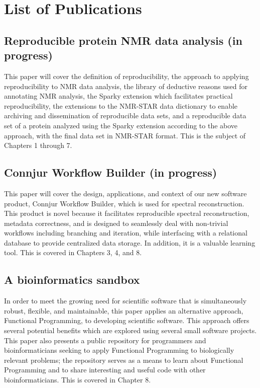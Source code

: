 \chapter{List of Publications}

\section{Reproducible protein NMR data analysis (in progress)}
This paper will cover the definition of reproducibility, the approach to
applying reproducibility to NMR data analysis, the library of deductive
reasons used for annotating NMR analysis, the Sparky extension which 
facilitates practical reproducibility, the extensions to the NMR-STAR
data dictionary to enable archiving and dissemination of reproducible
data sets, and a reproducible data set of a protein analyzed using the Sparky
extension according to the above approach, with the final data set in 
NMR-STAR format.  This is the subject of Chapters 1 through 7.


\section{Connjur Workflow Builder (in progress)}
This paper \cite{connjur-wb} will cover the design, applications, and context
of our new software product, Connjur Workflow Builder, which is used for
spectral reconstruction.  This product is novel because it facilitates 
reproducible spectral reconstruction, metadata correctness, and is designed
to seamlessly deal with non-trivial workflows including branching and 
iteration, while interfacing with a relational database to provide centralized
data storage.  In addition, it is a valuable learning tool.  This is covered
in Chapters 3, 4, and 8.


\section{A bioinformatics sandbox}
In order to meet the growing need for scientific software that is 
simultaneously robust, flexible, and maintainable, this paper 
\cite{fenwick2012} applies an alternative approach, Functional Programming,
to developing scientific software.  This approach offers several potential
benefits which are explored using several small software projects. 
This paper also presents a public repository for programmers and bioinformaticians 
seeking to apply Functional Programming to biologically relevant problems; the
repository serves as a means to learn about Functional Programming and to share
interesting and useful code with other bioinformaticians.
This is covered in Chapter 8.



